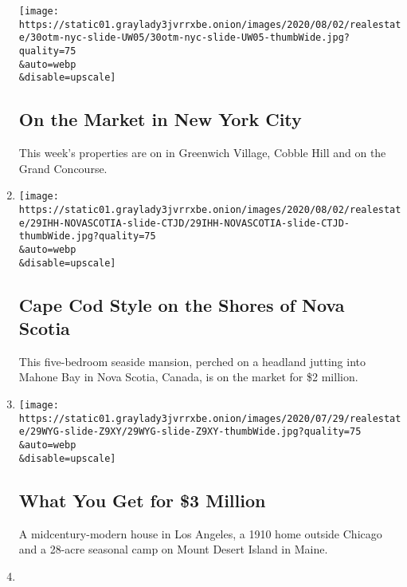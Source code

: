 \begin{enumerate}
  \texttt{[image: https://static01.graylady3jvrrxbe.onion/images/2020/08/02/realestate/30otm-nyc-slide-UW05/30otm-nyc-slide-UW05-thumbWide.jpg?quality=75\\\&auto=webp\\\&disable=upscale]}

  \hypertarget{on-the-market-in-new-york-city}{%
  \subsection{On the Market in New York
  City}\label{on-the-market-in-new-york-city}}

  This week's properties are on in Greenwich Village, Cobble Hill and on
  the Grand Concourse.
\item
  \href{/slideshow/2020/07/29/realestate/cape-cod-style-on-the-shores-of-nova-scotia.html}{}

  \texttt{[image: https://static01.graylady3jvrrxbe.onion/images/2020/08/02/realestate/29IHH-NOVASCOTIA-slide-CTJD/29IHH-NOVASCOTIA-slide-CTJD-thumbWide.jpg?quality=75\\\&auto=webp\\\&disable=upscale]}

  \hypertarget{cape-cod-style-on-the-shores-of-nova-scotia}{%
  \subsection{Cape Cod Style on the Shores of Nova
  Scotia}\label{cape-cod-style-on-the-shores-of-nova-scotia}}

  This five-bedroom seaside mansion, perched on a headland jutting into
  Mahone Bay in Nova Scotia, Canada, is on the market for \$2 million.
\item
  \href{/slideshow/2020/07/29/realestate/what-you-get-for-3-million.html}{}

  \texttt{[image: https://static01.graylady3jvrrxbe.onion/images/2020/07/29/realestate/29WYG-slide-Z9XY/29WYG-slide-Z9XY-thumbWide.jpg?quality=75\\\&auto=webp\\\&disable=upscale]}

  \hypertarget{what-you-get-for-3-million}{%
  \subsection{What You Get for \$3
  Million}\label{what-you-get-for-3-million}}

  A midcentury-modern house in Los Angeles, a 1910 home outside Chicago
  and a 28-acre seasonal camp on Mount Desert Island in Maine.
\item
  \href{/slideshow/2020/07/29/realestate/living-in-north-bergen-nj.html}{}


\end{enumerate}
